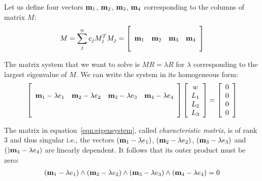 \documentclass{birkjour}
\numberwithin{equation}{section}
\begin{document}
Let us define four vectors $\textbf m_1$, $\textbf m_2$, $\textbf m_3$, $\textbf m_4$ corresponding to the columns of matrix $M$:
\begin{eqnarray}
	M = \sum_j^n { c_j M_j^T M_j} =
	\left[\begin{array}{cccc}
		\\
		\textbf m_1 & \textbf m_2 & \textbf m_3 & \textbf m_4 \\
		\\
	\end{array}\right]
\end{eqnarray}

The matrix system that we want to solve is $M R = \lambda R$ for $\lambda$ corresponding to the largest eigenvalue of $M$. We can write the system in its homogeneous form:
\begin{eqnarray}
	\label{eqn:eigensystem}
	\left[\begin{array}{cccc}
		\\
		\textbf m_1 - \lambda e_1 & \textbf m_2 - \lambda e_2 & \textbf m_3 - \lambda e_3 & \textbf m_4- \lambda e_4 \\
		\\
		\\
	\end{array}\right]
	\left[\begin{array}{c} 
		w \\
		L_1\\
		L_2\\
		L_3
	\end{array}\right] = 	
	\left[\begin{array}{c} 
		0 \\
		0 \\
		0 \\
		0
	\end{array}\right]
\end{eqnarray}

The matrix in equation~\ref{eqn:eigensystem}, called \emph{characteristic matrix}, is of rank $3$ and thus singular i.e., the vectors $(\textbf m_1 - \lambda e_1)$, $(\textbf m_2 - \lambda e_2)$, $(\textbf m_3 - \lambda e_3)$ and $()\textbf m_4- \lambda e_4)$ are linearly dependent. It follows that its outer product must be zero:
\begin{eqnarray}
\label{eqn:characteristic_outer_product}
(\textbf m_1 - \lambda e_1)\wedge(\textbf m_2 - \lambda e_2)\wedge(\textbf m_3 - \lambda e_3)\wedge(\textbf m_4- \lambda e_4) = 0
\end{eqnarray}
\end{document}
